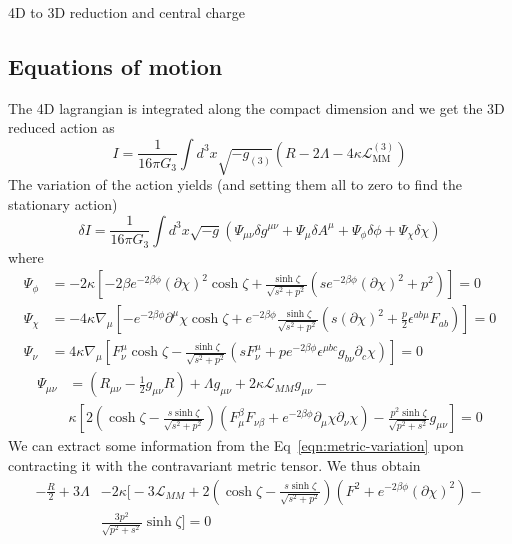 \begin{frame}[allowframebreaks]{4D to 3D reduction and central charge \cite{Dharewa2024}}
\subsection{Equations of motion}
The 4D lagrangian is integrated along the compact dimension and we get the 3D reduced action as  
\begin{equation}
    I = \frac{1}{16\pi G_3}\int d^3x\sqrt{-g_{(3)}} \left(R - 2\Lambda - 4\kappa\mathcal{L}_{\text{MM}}^{(3)}\right)
\end{equation}
The variation of the action yields (and setting them all to zero to find the stationary action) 
\begin{equation}
    \delta I = \frac{1}{16\pi G_3}\int d^3x \sqrt{-g} \left ( \Psi_{\mu\nu}\delta g^{\mu\nu} + \Psi_\mu \delta A^\mu + \Psi_\phi \delta \phi + \Psi_\chi \delta \chi \right) 
\end{equation}
where 
\begin{align}
    \Psi_\phi &= -2\kappa \left [ -2\beta e^{-2\beta\phi} (\partial \chi)^2\cosh\zeta + \frac{\sinh\zeta}{\sqrt{s^2+p^2} } \left ( s e^{-2\beta\phi} (\partial \chi)^2 + p^2\right) \right ] = 0\\ 
    \Psi_\chi &= -4\kappa \nabla_\mu \left [-e^{-2\beta\phi} \partial^\mu \chi \cosh\zeta + e^{-2\beta\phi}\frac{\sinh\zeta}{\sqrt{s^2+p^2} } \left ( s (\partial \chi)^2 + \frac{p}{2}\epsilon^{ab\mu}F_{ab}\right)  \right ] = 0 \\ 
    \Psi_\nu &= 4\kappa \nabla_\mu \left [ F^\mu_\nu\cosh\zeta -  \frac{\sinh\zeta}{\sqrt{s^2+p^2} } \left ( s F^\mu_\nu + p e^{-2\beta\phi}\epsilon^{\mu bc}g_{b\nu}\partial_c\chi\right) \right ] = 0
\end{align}
\begin{align}
    \label{eqn:metric-variation}
    \Psi_{\mu\nu} &= \left ( R_{\mu\nu} - \frac{1}{2}g_{\mu\nu}R \right ) + \Lambda g_{\mu\nu} + 2\kappa \mathcal{L}_{MM}g_{\mu\nu} - \nonumber\\ & \kappa \left [ 2 \left ( \cosh \zeta - \frac{s \sinh \zeta}{\sqrt{s^2+p^2} } \right ) \left ( F^\beta_\mu F_{\nu\beta} + e^{-2\beta\phi}\partial_\mu\chi\partial_\nu\chi \right ) - \frac{p^2\sinh\zeta}{\sqrt{p^2+s^2} }g_{\mu\nu}\right ] = 0
\end{align}
We can extract some information from the Eq~\ref{eqn:metric-variation} upon contracting it with the contravariant metric tensor. We thus obtain 
\begin{align}
    -\frac{R}{2} + 3\Lambda &-2\kappa \Biggl [-3\mathcal{L}_{MM} + 2 \left ( \cosh \zeta - \frac{s \sinh \zeta}{\sqrt{s^2+p^2} } \right ) \left ( F^2 + e^{-2\beta\phi} (\partial \chi)^2\right ) - \nonumber\\ &\frac{3p^2}{\sqrt{p^2+s^2} }\sinh\zeta \Biggl ] = 0
\end{align}
\end{frame}


